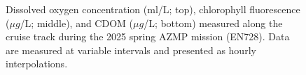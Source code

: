\documentclass[12pt]{article}\usepackage[]{graphicx}\usepackage[]{color}
\begin{document}
\begin{figure}[H]

{\centering {}   

}

\caption{Dissolved oxygen concentration (ml/L; top), chlorophyll fluorescence (\(\mu g\)/L; middle), and CDOM (\(\mu g\)/L; bottom) measured along the cruise track during the 2025 spring AZMP mission (EN728). Data are measured at variable intervals and presented as hourly interpolations.}\label{fig:figure5}
\end{figure}
\clearpage
\end{document}
